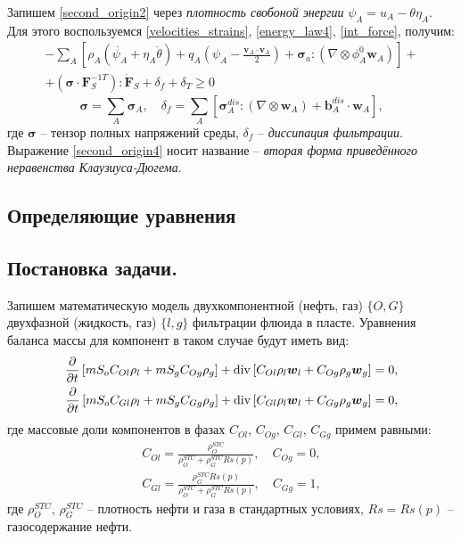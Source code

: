 	Запишем \eqref{second_origin2} через \textit{плотность свобоной энергии} $\psi_A = u_A - \theta \eta_A$. Для этого воспользуемся \eqref{velocities_strains}, \eqref{energy_law4}, \eqref{int_force}, получим:
\begin{multline}
	\label{second_origin3}
	-\sum\limits_{A} \left[\rho_A \left(\dot{\psi_A} + \eta_A\dot{\theta}\right) + q_A\left(\psi_A - \frac{\boldsymbol{v}_A\cdot \boldsymbol{v}_A}{2}\right) + \boldsymbol{\sigma}_a :\left(\nabla \otimes \phi_A^0 \boldsymbol{w}_A\right)\right]+\\
	+\left(\boldsymbol{\sigma} \cdot \boldsymbol{F}_S^{-1T}\right) : \dot{\boldsymbol{F}}_S + \delta_f + \delta_T \geq 0
\end{multline}
\begin{equation}
	\label{second_origin4}
	\boldsymbol{\sigma} = \sum_A \boldsymbol{\sigma}_A, 
	\quad \delta_f = \sum_A\left[\boldsymbol{\sigma}_A^{dis}:\left(\nabla \otimes \boldsymbol{w}_A\right)+\boldsymbol{b}_A^{dis} \cdot \boldsymbol{w}_A\right],
\end{equation}
	где $\boldsymbol{\sigma}$ -- тензор полных напряжений среды,
	$\delta_f$ -- \textit{диссипация фильтрации}.
	Выражение \eqref{second_origin4} носит название -- \textit{вторая форма приведённого неравенства Клаузиуса-Дюгема}.
	
\subsection{Определяющие уравнения}

\subsection{Постановка задачи.}
	Запишем математическую модель двухкомпонентной (нефть, газ) $\{O, G\}$ двухфазной (жидкость, газ) $\{l, g\}$ фильтрации флюида в пласте.
	Уравнения баланса массы для компонент в таком случае будут иметь вид:
\begin{align}
	\label{eqns1}
	\frac{\partial}{\partial{t}}\left[mS_oC_{Ol}\rho_l+mS_gC_{Og}\rho_g\right]+
	{\rm div}\,{\left[C_{Ol}\rho_l\boldsymbol{w}_l+C_{Og}\rho_g\boldsymbol{w}_g\right]} = 0,\\
	\frac{\partial}{\partial{t}}\left[mS_oC_{Gl}\rho_l+mS_gC_{Gg}\rho_g\right]+
	{\rm div}\,{\left[C_{Gl}\rho_l\boldsymbol{w}_l+C_{Gg}\rho_g\boldsymbol{w}_g\right]} = 0,
\end{align}
	где массовые доли компонентов в фазах $C_{Ol}$, $C_{Og}$, $C_{Gl}$, $C_{Gg}$ примем равными:
\begin{align}
	\label{fractions}
	C_{Ol} = \frac{\rho_O^{STC}}{\rho_O^{STC} + \rho_G^{STC}Rs(p)}, \quad C_{Og} = 0,\nonumber\\
	C_{Gl} = \frac{\rho_G^{STC}Rs(p)}{\rho_O^{STC} + \rho_G^{STC}Rs(p)}, \quad C_{Gg} = 1,
\end{align}
	где $\rho_O^{STC}$, $\rho_G^{STC}$ -- плотность нефти и газа в стандартных условиях,
	$Rs = Rs(p)$ -- газосодержание нефти.

